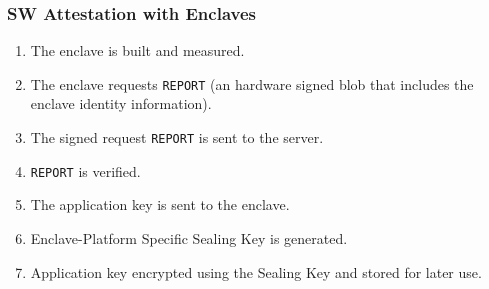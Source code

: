 \subsubsection{SW Attestation with Enclaves}
\begin{enumerate}
    \item The enclave is built and measured.
    \item The enclave requests \texttt{REPORT} (an hardware signed blob that includes the enclave identity information).
    \item The signed request \texttt{REPORT} is sent to the server.
    \item \texttt{REPORT} is verified.
    \item The application key is sent to the enclave.
    \item Enclave-Platform Specific Sealing Key is generated.
    \item Application key encrypted using the Sealing Key and stored for later use.
\end{enumerate}